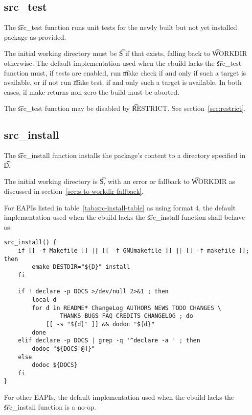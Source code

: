 \subsection{src\_test}
\label{sec:src-test-function}

The \t{src\_test} function runs unit tests for the newly built but not yet installed package as
provided.

The initial working directory must be \t{S} if that exists, falling back to \t{WORKDIR} otherwise.
The default implementation used when the ebuild lacks the \t{src\_test} function must, if tests are
enabled, run \t{make check} if and only if such a target is available, or if not run \t{make test},
if and only such a target is available. In both cases, if make returns non-zero the build must be
aborted.

The \t{src\_test} function may be disabled by \t{RESTRICT}. See section~\ref{sec:restrict}.

\subsection{src\_install}
\label{sec:src-install-function}

 The \t{src\_install} function installs the package's content to a
directory specified in \t{D}.

The initial working directory is \t{S}, with an error or fallback to \t{WORKDIR} as discussed in
section~\ref{sec:s-to-workdir-fallback}.

 For EAPIs listed in table~\ref{tab:src-install-table} as using format
4, the default implementation used when the ebuild lacks the \t{src\_install} function shall behave
as:

\begin{verbatim}
src_install() {
    if [[ -f Makefile ]] || [[ -f GNUmakefile ]] || [[ -f makefile ]]; then
        emake DESTDIR="${D}" install
    fi

    if ! declare -p DOCS >/dev/null 2>&1 ; then
        local d
        for d in README* ChangeLog AUTHORS NEWS TODO CHANGES \
                THANKS BUGS FAQ CREDITS CHANGELOG ; do
            [[ -s "${d}" ]] && dodoc "${d}"
        done
    elif declare -p DOCS | grep -q '^declare -a ' ; then
        dodoc "${DOCS[@]}"
    else
        dodoc ${DOCS}
    fi
}
\end{verbatim}

For other EAPIs, the default implementation used when the ebuild lacks the \t{src\_install} function
is a no-op.

